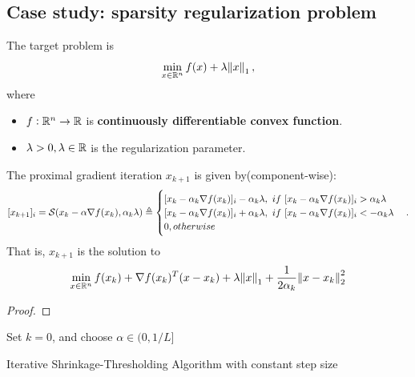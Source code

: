 \begin{refsection}
\subsection{Case study: sparsity regularization problem}\label{ch:convex-optimization:sec:sparsityRegularization}
\begin{definition}
	The target problem is
	$$\min_{x\in\mathbb{R}^n} f(x) + \lambda \norm{x}_1,$$
	where
	\begin{itemize}
		\item $f:\mathbb{R}^n\to \mathbb{R}$ is \textbf{continuously differentiable convex function}.
		\item $\lambda > 0, \lambda\in \mathbb{R}$ is the regularization parameter. 
	\end{itemize}
\end{definition}

\begin{lemma}
The proximal gradient iteration $x_{k+1}$ is given by(component-wise):
$$[x_{k+1}]_i = \mathcal{S}(x_k-\alpha\nabla f(x_k),\alpha_k\lambda) \triangleq \begin{cases}
[x_k - \alpha_k \nabla f(x_k)]_i - \alpha_k \lambda, ~if~ [x_k - \alpha_k \nabla f(x_k)]_i > \alpha_k \lambda \\
[x_k - \alpha_k \nabla f(x_k)]_i + \alpha_k \lambda, ~if~ [x_k - \alpha_k \nabla f(x_k)]_i <- \alpha_k \lambda \\
0, otherwise
\end{cases}.$$
That is, $x_{k+1}$ is the solution to
$$
\min_{x\in\mathbb{R}^n} f(x_k) + \nabla f(x_k)^T(x-x_k) + \lambda \norm{x}_1 + \frac{1}{2\alpha_k}\norm{x-x_k}_2^2$$
\end{lemma}
\begin{proof}
	
\end{proof}



\begin{algorithm}[H]
	\SetAlgoLined
	
	Set $k = 0$, and choose $\alpha \in (0,1/L]$ \\
	\caption{Iterative Shrinkage-Thresholding Algorithm with constant step size}
\end{algorithm}	




\end{refsection}
